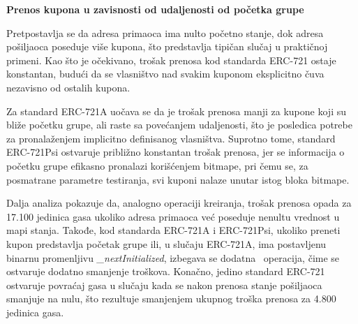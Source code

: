 \begin{description}
\item \textbf{Prenos kupona u zavisnosti od udaljenosti od početka grupe}

Pretpostavlja se da adresa primaoca ima nulto početno stanje, dok adresa pošiljaoca poseduje više kupona, što predstavlja tipičan slučaj u praktičnoj primeni. Kao što je očekivano, trošak prenosa kod standarda ERC-721 ostaje konstantan, budući da se vlasništvo nad svakim kuponom eksplicitno čuva nezavisno od ostalih kupona.

Za standard ERC-721A uočava se da je trošak prenosa manji za kupone koji su bliže početku grupe, ali raste sa povećanjem udaljenosti, što je posledica potrebe za pronalaženjem implicitno definisanog vlasništva. Suprotno tome, standard ERC-721Psi ostvaruje približno konstantan trošak prenosa, jer se informacija o početku grupe efikasno pronalazi korišćenjem bitmape, pri čemu se, za posmatrane parametre testiranja, svi kuponi nalaze unutar istog bloka bitmape.

Dalja analiza pokazuje da, analogno operaciji kreiranja, trošak prenosa opada za 17.100 jedinica gasa ukoliko adresa primaoca već poseduje nenultu vrednost u mapi stanja. Takođe, kod standarda ERC-721A i ERC-721Psi, ukoliko preneti kupon predstavlja početak grupe ili, u slučaju ERC-721A, ima postavljenu binarnu promenljivu \textit{\_nextInitialized}, izbegava se dodatna \Sj\ operacija, čime se ostvaruje dodatno smanjenje troškova. Konačno, jedino standard ERC-721 ostvaruje povraćaj gasa u slučaju kada se nakon prenosa stanje pošiljaoca smanjuje na nulu, što rezultuje smanjenjem ukupnog troška prenosa za 4.800 jedinica gasa.

\begin{rezultati}[H]
\centering

\begin{minipage}{0.48\textwidth}
\centering


\end{minipage}
\end{rezultati}
\end{description}
